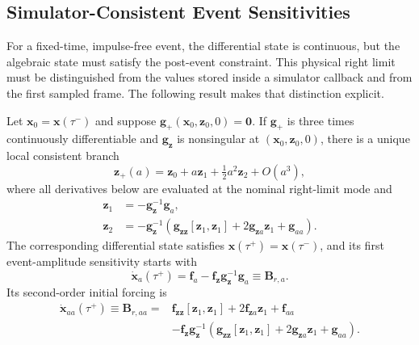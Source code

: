 \subsection{Simulator-Consistent Event Sensitivities}

For a fixed-time, impulse-free event, the differential state is continuous, but the
algebraic state must satisfy the post-event constraint. This physical right limit
must be distinguished from the values stored inside a simulator callback and from
the first sampled frame. The following result makes that distinction explicit.

\begin{theorem}
Let $\bm x_0=\bm x(\tau^-)$ and suppose
$\bm g_+(\bm x_0,\bm z_0,0)=\bm0$. If $\bm g_+$ is three times continuously
differentiable and $\bm g_{\bm z}$ is nonsingular at
$(\bm x_0,\bm z_0,0)$, there is a unique local consistent branch
\begin{equation}
 \bm z_+(a)=\bm z_0+a\bm z_1+\tfrac12a^2\bm z_2+O(a^3),
 \label{eq:supp-consistency-branch}
\end{equation}
where all derivatives below are evaluated at the nominal right-limit mode and
\begin{align}
 \bm z_1&=-\bm g_{\bm z}^{-1}\bm g_a,
 \label{eq:supp-consistency-first}\\
 \bm z_2&=-\bm g_{\bm z}^{-1}
 \left(\bm g_{\bm z\bm z}[\bm z_1,\bm z_1]
 +2\bm g_{\bm z a}\bm z_1+\bm g_{aa}\right).
 \label{eq:supp-consistency-second}
\end{align}
The corresponding differential state satisfies
$\bm x(\tau^+)=\bm x(\tau^-)$, and its first event-amplitude sensitivity starts
with
\begin{equation}
 \dot{\bm x}_a(\tau^+)
 =\bm f_a-\bm f_{\bm z}\bm g_{\bm z}^{-1}\bm g_a
 \equiv \bm B_{r,a}.
 \label{eq:supp-reduced-event-forcing}
\end{equation}
Its second-order initial forcing is
\begin{align}
 \dot{\bm x}_{aa}(\tau^+)\equiv\bm B_{r,aa}
 ={}&\bm f_{\bm z\bm z}[\bm z_1,\bm z_1]
 +2\bm f_{\bm z a}\bm z_1+\bm f_{aa}\nonumber\\
 &-\bm f_{\bm z}\bm g_{\bm z}^{-1}
 \left(\bm g_{\bm z\bm z}[\bm z_1,\bm z_1]
 +2\bm g_{\bm z a}\bm z_1+\bm g_{aa}\right).
 \label{eq:supp-reduced-second-forcing}
\end{align}
\label{thm:supp-consistency-jump}
\end{theorem}

